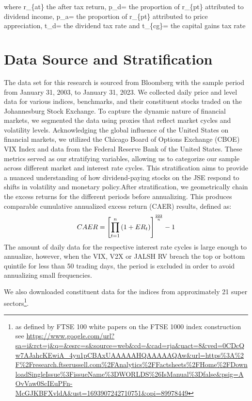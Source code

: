 \documentclass[11pt,preprint, authoryear]{elsarticle}
\numberwithin{equation}{section}
\numberwithin{figure}{section}
\numberwithin{table}{section}
\let\rmarkdownfootnote\footnote%
\def\footnote{\protect\rmarkdownfootnote}
\begin{document}
where r\_\{at\} the after tax return, p\_d= the proportion of r\_\{pt\}
attributed to dividend income, p\_a= the proportion of r\_\{pt\}
attributed to price appreciation, t\_d= the dividend tax rate and
t\_\{cg\}= the capital gains tax rate

\newpage

\hypertarget{data-source-and-stratification}{%
\section*{Data Source and
Stratification}\label{data-source-and-stratification}}

The data set for this research is sourced from Bloomberg with the sample
period from January 31, 2003, to January 31, 2023. We collected daily
price and level data for various indices, benchmarks, and their
constituent stocks traded on the Johannesburg Stock Exchange. To capture
the dynamic nature of financial markets, we segmented the data using
proxies that reflect market cycles and volatility levels. Acknowledging
the global influence of the United States on financial markets, we
utilized the Chicago Board of Options Exchange (CBOE) VIX Index and data
from the Federal Reserve Bank of the United States. These metrics served
as our stratifying variables, allowing us to categorize our sample
across different market and interest rate cycles. This stratification
aims to provide a nuanced understanding of how dividend-paying stocks on
the JSE respond to shifts in volatility and monetary policy.After
stratification, we geometrically chain the excess returns for the
different periods before annualizing. This produces comparable
cumulative annualized excess return (CAER) results, defined as:
\begin{align}
C A E R=\left[\prod_{t=1}^n\left(1+E R_t\right)\right]^{\frac{222}{n}}-1 \notag
\end{align} The amount of daily data for the respective interest rate
cycles is large enough to annualize, however, when the VIX, V2X or JALSH
RV breach the top or bottom quintile for less than 50 trading days, the
period is excluded in order to avoid annualizing small frequencies.

We also downloaded constituent data for the indices from approximately
21 super sectors\footnote{as defined by FTSE 100 white papers on the
  FTSE 1000 index construction see
  \url{https://www.google.com/url?sa=i\&rct=j\&q=\&esrc=s\&source=web\&cd=\&cad=rja\&uact=8\&ved=0CDcQw7AJahcKEwiA_4yu1pCBAxUAAAAAHQAAAAAQAw\&url=https\%3A\%2F\%2Fresearch.ftserussell.com\%2FAnalytics\%2FFactsheets\%2FHome\%2FDownloadSingleIssue\%3FissueName\%3DWORLDS\%26IsManual\%3Dfalse\&psig=AOvVaw0ScIEuPFn-McGJKBFXvldA\&ust=1693907242710751\&opi=89978449}}.
\end{document}
